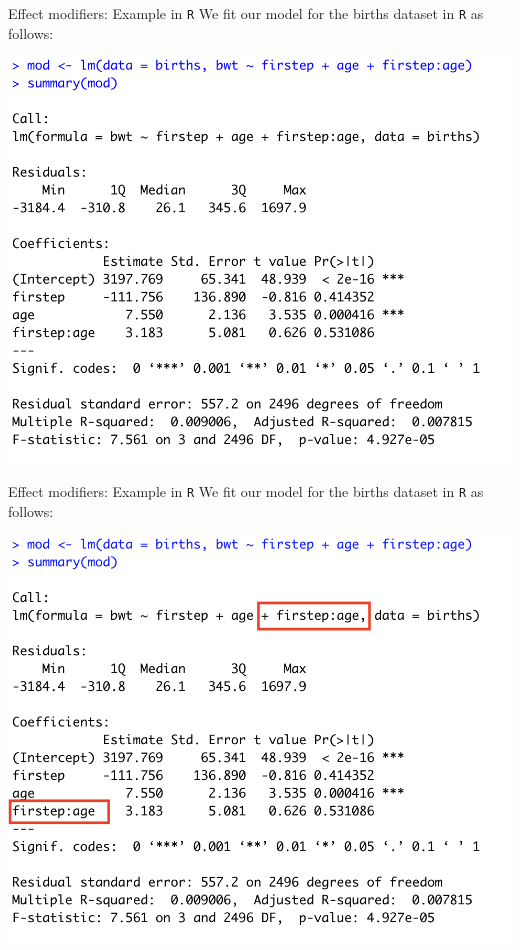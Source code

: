 \documentclass[10pt,t]{beamer}
\begin{document}
\begin{frame}{Effect modifiers: Example in \texttt{R}}
We fit our model for the births dataset in \texttt{R} as follows:

\vspace{0.3cm}

\centering \includegraphics[scale=0.4]{interact_mod.png}
\end{frame}

\begin{frame}{Effect modifiers: Example in \texttt{R}}
We fit our model for the births dataset in \texttt{R} as follows:

\vspace{0.3cm}

\centering \includegraphics[scale=0.4]{interact_mod2.png}
\end{frame}
\end{document}
